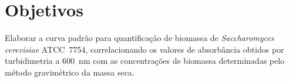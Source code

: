 
\section{Objetivos}

Elaborar a curva padrão para quantificação de biomassa de \textit{Saccharomyces cerevisiae} ATCC~7754, correlacionando os valores de absorbância obtidos por turbidimetria a 600~nm com as concentrações de biomassa determinadas pelo método gravimétrico da massa seca.
